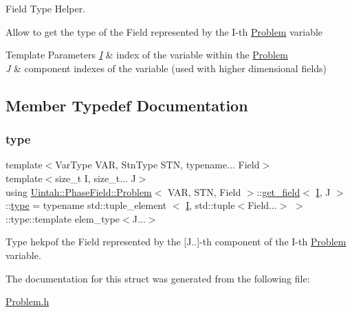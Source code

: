 Field Type Helper. 

Allow to get the type of the Field represented by the I-\/th \hyperlink{classUintah_1_1PhaseField_1_1Problem}{Problem} variable


\begin{DoxyTemplParams}{Template Parameters}
{\em \hyperlink{structUintah_1_1PhaseField_1_1I}{I}} & index of the variable within the \hyperlink{classUintah_1_1PhaseField_1_1Problem}{Problem} \\
\hline
{\em J} & component indexes of the variable (used with higher dimensional fields) \\
\hline
\end{DoxyTemplParams}


\subsection{Member Typedef Documentation}
\mbox{\label{structUintah_1_1PhaseField_1_1Problem_1_1get__field_a40f9a8ee2faf5e979fee6bc997991b85}} 
\subsubsection{\texorpdfstring{type}{type}}
{\footnotesize\ttfamily template$<$Var\+Type V\+AR, Stn\+Type S\+TN, typename... Field$>$ \\
template$<$size\+\_\+t I, size\+\_\+t... J$>$ \\
using \hyperlink{classUintah_1_1PhaseField_1_1Problem}{Uintah\+::\+Phase\+Field\+::\+Problem}$<$ V\+AR, S\+TN, Field $>$\+::\hyperlink{structUintah_1_1PhaseField_1_1Problem_1_1get__field}{get\+\_\+field}$<$ \hyperlink{structUintah_1_1PhaseField_1_1I}{I}, J $>$\+::\hyperlink{structUintah_1_1PhaseField_1_1Problem_1_1get__field_a40f9a8ee2faf5e979fee6bc997991b85}{type} =  typename std\+::tuple\+\_\+element $<$ \hyperlink{structUintah_1_1PhaseField_1_1I}{I}, std\+::tuple$<$Field...$>$ $>$\+::type\+::template elem\+\_\+type$<$J...$>$}



Type hekpof the Field represented by the \mbox{[}J..\mbox{]}-\/th component of the I-\/th \hyperlink{classUintah_1_1PhaseField_1_1Problem}{Problem} variable. 



The documentation for this struct was generated from the following file\+:\begin{DoxyCompactItemize}
\item 
\hyperlink{Problem_8h}{Problem.\+h}\end{DoxyCompactItemize}
